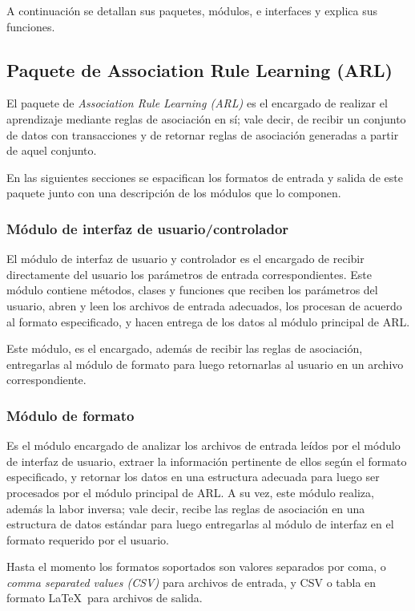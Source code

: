 A continuación se detallan sus paquetes, módulos, e interfaces y explica sus funciones.

\subsection{Paquete de Association Rule Learning (ARL)}

El paquete de \textit{Association Rule Learning (ARL)} es el encargado de realizar el aprendizaje mediante reglas de asociación en sí; vale decir, de recibir un conjunto de datos con transacciones y de retornar reglas de asociación generadas a partir de aquel conjunto.

En las siguientes secciones se espacifican los formatos de entrada y salida de este paquete junto con una descripción de los módulos que lo componen.

\subsubsection{Módulo de interfaz de usuario/controlador}

El módulo de interfaz de usuario y controlador es el encargado de recibir directamente del usuario los parámetros de entrada correspondientes. Este módulo contiene métodos, clases y funciones que reciben los parámetros del usuario, abren y leen los archivos de entrada adecuados, los procesan de acuerdo al formato especificado, y hacen entrega de los datos al módulo principal de ARL.

Este módulo, es el encargado, además de recibir las reglas de asociación, entregarlas al módulo de formato para luego retornarlas al usuario en un archivo correspondiente.

\subsubsection{Módulo de formato}

Es el módulo encargado de analizar los archivos de entrada leídos por el módulo de interfaz de usuario, extraer la información pertinente de ellos según el formato especificado, y retornar los datos en una estructura adecuada para luego ser procesados por el módulo principal de ARL. A su vez, este módulo realiza, además la labor inversa; vale decir, recibe las reglas de asociación en una estructura de datos estándar para luego entregarlas al módulo de interfaz en el formato requerido por el usuario.

Hasta el momento los formatos soportados son valores separados por coma, o \textit{comma separated values (CSV)} para archivos de entrada, y CSV o tabla en formato \LaTeX\ para archivos de salida.


